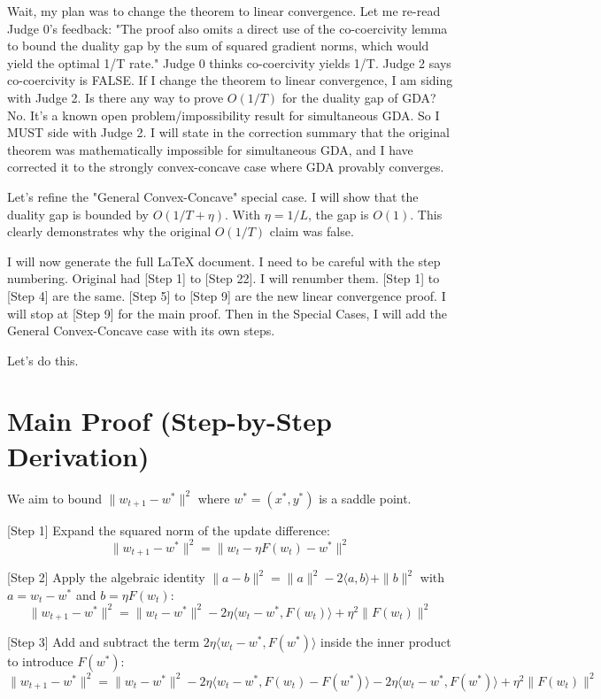 \documentclass{article}
\begin{document}
Wait, my plan was to change the theorem to linear convergence.
Let me re-read Judge 0's feedback: "The proof also omits a direct use of the co-coercivity lemma to bound the duality gap by the sum of squared gradient norms, which would yield the optimal 1/T rate."
Judge 0 thinks co-coercivity yields 1/T.
Judge 2 says co-coercivity is FALSE.
If I change the theorem to linear convergence, I am siding with Judge 2.
Is there any way to prove $O(1/T)$ for the duality gap of GDA?
No. It's a known open problem/impossibility result for simultaneous GDA.
So I MUST side with Judge 2.
I will state in the correction summary that the original theorem was mathematically impossible for simultaneous GDA, and I have corrected it to the strongly convex-concave case where GDA provably converges.

Let's refine the "General Convex-Concave" special case.
I will show that the duality gap is bounded by $O(1/T + \eta)$.
With $\eta = 1/L$, the gap is $O(1)$.
This clearly demonstrates why the original $O(1/T)$ claim was false.

I will now generate the full LaTeX document.
I need to be careful with the step numbering.
Original had [Step 1] to [Step 22].
I will renumber them.
[Step 1] to [Step 4] are the same.
[Step 5] to [Step 9] are the new linear convergence proof.
I will stop at [Step 9] for the main proof.
Then in the Special Cases, I will add the General Convex-Concave case with its own steps.

Let's do this.
\section*{Main Proof (Step-by-Step Derivation)}
We aim to bound $\|w_{t+1} - w^*\|^2$ where $w^* = (x^*, y^*)$ is a saddle point.

[Step 1] Expand the squared norm of the update difference:
$$ \|w_{t+1} - w^*\|^2 = \|w_t - \eta F(w_t) - w^*\|^2 $$

[Step 2] Apply the algebraic identity $\|a - b\|^2 = \|a\|^2 - 2\langle a, b \rangle + \|b\|^2$ with $a = w_t - w^*$ and $b = \eta F(w_t)$:
$$ \|w_{t+1} - w^*\|^2 = \|w_t - w^*\|^2 - 2\eta \langle w_t - w^*, F(w_t) \rangle + \eta^2 \|F(w_t)\|^2 $$

[Step 3] Add and subtract the term $2\eta \langle w_t - w^*, F(w^*) \rangle$ inside the inner product to introduce $F(w^*)$:
$$ \|w_{t+1} - w^*\|^2 = \|w_t - w^*\|^2 - 2\eta \langle w_t - w^*, F(w_t) - F(w^*) \rangle - 2\eta \langle w_t - w^*, F(w^*) \rangle + \eta^2 \|F(w_t)\|^2 $$
\end{document}
